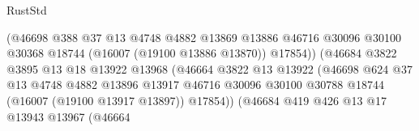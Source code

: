 \begin{lexlean}{RustStd}
\begin{coremodule}
                                            (@46698
                                              @388
                                              @37
                                              @13
                                              @4748
                                              @4882
                                              @13869
                                              @13886
                                              @46716
                                              @30096
                                              @30100
                                              @30368
                                              @18744
                                              (@16007 (@19100 @13886 @13870))
                                              @17854))
                                          (@46684
                                            @3822
                                            @3895
                                            @13
                                            @18
                                            @13922
                                            @13968
                                            (@46664
                                              @3822
                                              @13
                                              @13922
                                              (@46698
                                                @624
                                                @37
                                                @13
                                                @4748
                                                @4882
                                                @13896
                                                @13917
                                                @46716
                                                @30096
                                                @30100
                                                @30788
                                                @18744
                                                (@16007 (@19100 @13917 @13897))
                                                @17854))
                                            (@46684
                                              @419
                                              @426
                                              @13
                                              @17
                                              @13943
                                              @13967
                                              (@46664

\end{coremodule}
\end{lexlean}
